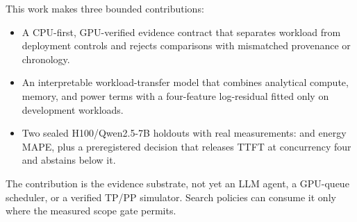 This work makes three bounded contributions:
\begin{itemize}
  \item A CPU-first, GPU-verified evidence contract that separates workload
  from deployment controls and rejects comparisons with mismatched provenance
  or chronology.
  \item An interpretable workload-transfer model that combines analytical
  compute, memory, and power terms with a four-feature log-residual fitted only
  on development workloads.
  \item Two sealed H100/Qwen2.5-7B holdouts with \BlindMeasurements{} real
  measurements: \CalibratedEnergyMAPE{} and \ConfirmationEnergyMAPE{} energy
  MAPE, plus a preregistered decision that releases TTFT at concurrency four
  and abstains below it.
\end{itemize}

The contribution is the evidence substrate, not yet an LLM agent, a GPU-queue
scheduler, or a verified TP/PP simulator.  Search policies can consume it only
where the measured scope gate permits.
